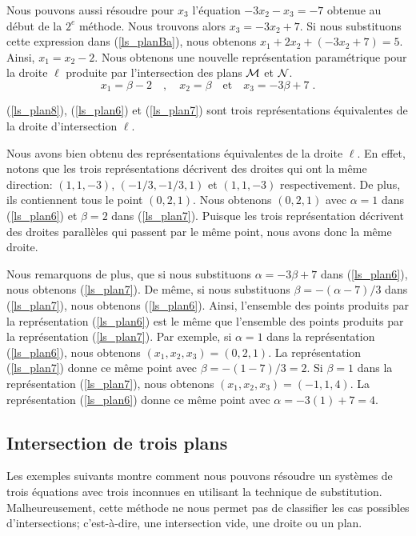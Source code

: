 {\begin{egg}
 Nous pouvons aussi résoudre pour
$x_3$ l'équation $-3 x_2 -x_3 = -7$ obtenue au début de la
$2^e$ méthode.  Nous trouvons alors $x_3= -3x_2 + 7$.  Si nous substituons
cette expression dans (\ref{ls_planBa}), nous obtenons $x_1+2x_2+(-3x_2+7)=5$.
Ainsi, $x_1 = x_2 -2$.  Nous obtenons une nouvelle représentation
paramétrique pour la droite $\ell$ produite par l'intersection des
plans $\cal M$ et $\cal N$.
\begin{equation} \label{ls_plan7}
  x_1 = \beta - 2 \quad , \quad x_2 = \beta \quad \text{et} \quad
  x_3 = -3 \beta + 7 \; .
\end{equation}

(\ref{ls_plan8}), (\ref{ls_plan6}) et (\ref{ls_plan7}) sont trois 
représentations équivalentes de la droite d'intersection $\ell$.

Nous avons bien obtenu des représentations équivalentes de la droite
$\ell$.  En effet, notons que les trois représentations décrivent des
droites qui ont la même direction: $(1,1,-3)$, $(-1/3,-1/3,1)$ et
$(1,1,-3)$ respectivement.  De plus, ils contiennent tous le point
$(0,2,1)$.  Nous obtenons $(0,2,1)$ avec $\alpha=1$ dans (\ref{ls_plan6})
et $\beta =2$ dans (\ref{ls_plan7}).  Puisque les trois représentation
décrivent des droites parallèles qui passent par le même point, nous avons
donc la même droite.

Nous remarquons de plus, que si nous substituons $\alpha = -3\beta + 7$ dans
(\ref{ls_plan6}), nous obtenons (\ref{ls_plan7}).  De même, si nous
substituons $\beta = -(\alpha-7)/3$ dans (\ref{ls_plan7}), nous obtenons
(\ref{ls_plan6}).  Ainsi, l'ensemble des points produits par la
représentation (\ref{ls_plan6}) est le même que l'ensemble des points
produits par la représentation (\ref{ls_plan7}).   Par exemple, si
$\alpha = 1$ dans la représentation (\ref{ls_plan6}), nous obtenons
$(x_1,x_2,x_3) = ( 0, 2, 1)$.  La représentation (\ref{ls_plan7}) donne ce
même point avec $\beta = -(1-7)/3 = 2$.  Si $\beta = 1$ dans la
représentation (\ref{ls_plan7}), nous obtenons $(x_1,x_2,x_3) = ( -1, 1, 4)$.
La représentation (\ref{ls_plan6}) donne ce même point avec
$\alpha = -3 (1) + 7 = 4$.
\end{egg}

\subsection{Intersection de trois plans}

Les exemples suivants montre comment nous pouvons résoudre un systèmes de trois
équations avec trois inconnues en utilisant la technique de substitution.
Malheureusement, cette méthode ne nous permet pas de classifier les cas
possibles d'intersections; c'est-à-dire, une intersection vide, une droite ou
un plan.

}
